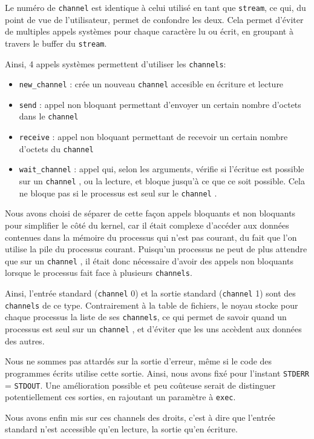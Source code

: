 \documentclass[a4paper,10pt, french]{article}
\newcommand{\code}[1]{\texttt{#1}}
\newcommand{\chan}{\texttt{channel} }
\begin{document}
Le numéro de \code{channel} est identique à celui utilisé en tant que \code{stream}, ce qui, du point de vue de l'utilisateur,
permet de confondre les deux. Cela permet d'éviter de multiples appels systèmes pour chaque caractère lu ou écrit, en groupant 
à travers le buffer du \code{stream}.

Ainsi, 4 appels systèmes permettent d'utiliser les \code{channels}:
\begin{itemize}
 \item \code{new\_channel} : crée un nouveau \code{channel} accesible en écriture et lecture
 \item \code{send} : appel non bloquant permettant d'envoyer un certain nombre d'octets dans le \chan
 \item \code{receive} : appel non bloquant permettant de recevoir un certain nombre d'octets du \chan
 \item \code{wait\_channel} : appel qui, selon les arguments, vérifie si l'écritue est possible sur un \chan, ou la lecture,
 et bloque jusqu'à ce que ce soit possible. Cela ne bloque pas si le processus est seul sur le \chan.
\end{itemize}

Nous avons choisi de séparer de cette façon appels bloquants et non bloquants pour simplifier le côté du kernel,
car il était complexe d'accéder aux données contenues dans la mémoire du processus qui n'est pas courant,
du fait que l'on utilise la pile du processus courant.
Puisqu'un processus ne peut de plus attendre que sur un \chan, il était donc nécessaire d'avoir des appels
non bloquants lorsque le processus fait face à plusieurs \code{channels}.

Ainsi, l'entrée standard (\code{channel} 0) et la sortie standard (\code{channel} 1) sont des \code{channels} de ce type.
Contrairement à la table de fichiers, le noyau stocke pour chaque processus la liste de ses \code{channels}, 
ce qui permet de savoir quand un processus est seul sur un \chan, et d'éviter que les uns accèdent aux données des 
autres.

Nous ne sommes pas attardés sur la sortie d'erreur, même si le code des programmes écrits utilise cette
sortie. Ainsi, nous avons fixé pour l'instant \code{STDERR} = \code{STDOUT}. Une amélioration possible et peu coûteuse
serait de distinguer potentiellement ces sorties, en rajoutant un paramètre à \code{exec}.

Nous avons enfin mis sur ces channels des droits, c'est à dire que l'entrée standard n'est accessible
qu'en lecture, la sortie qu'en écriture.
\end{document}
